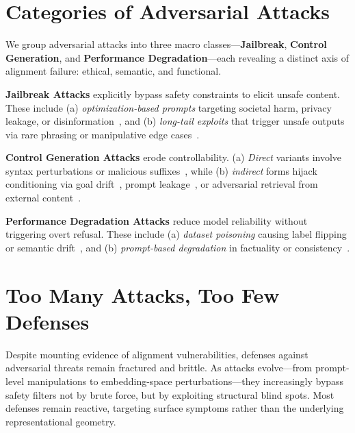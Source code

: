 




\vspace{-10mm}
\section{Categories of Adversarial Attacks}
\label{sec:attack_types}
\vspace{-0.5em}

We group adversarial attacks into three macro classes—\textbf{Jailbreak}, \textbf{Control Generation}, and \textbf{Performance Degradation}—each revealing a distinct axis of alignment failure: ethical, semantic, and functional. 


\textbf{Jailbreak Attacks} explicitly bypass safety constraints to elicit unsafe content. These include (a) \emph{optimization-based prompts} targeting societal harm, privacy leakage, or disinformation~\cite{wu2024llms, pair23, tap23}, and (b) \emph{long-tail exploits} that trigger unsafe outputs via rare phrasing or manipulative edge cases~\cite{jiang2023promptpacker, schulhoff2023hackaprompt}.

\textbf{Control Generation Attacks} erode controllability. (a) \emph{Direct} variants involve syntax perturbations or malicious suffixes~\cite{jiang2023promptpacker}, while (b) \emph{indirect} forms hijack conditioning via goal drift~\cite{chen2024pseudo}, prompt leakage~\cite{li2024pleak}, or adversarial retrieval from external content~\cite{greshake2023indirect}.

\textbf{Performance Degradation Attacks} reduce model reliability without triggering overt refusal. These include (a) \emph{dataset poisoning} causing label flipping or semantic drift~\cite{greshake2023indirect}, and (b) \emph{prompt-based degradation} in factuality or consistency~\cite{greshake2023indirect}.





\vspace{-2mm}
\section{Too Many Attacks, Too Few Defenses}
\vspace{-0.5em}

Despite mounting evidence of alignment vulnerabilities, defenses against adversarial threats remain fractured and brittle. As attacks evolve—from prompt-level manipulations to embedding-space perturbations—they increasingly bypass safety filters not by brute force, but by exploiting structural blind spots. Most defenses remain reactive, targeting surface symptoms rather than the underlying representational geometry.


